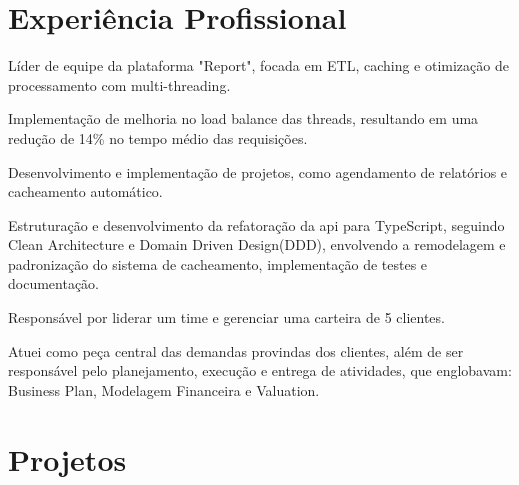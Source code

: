 \documentclass[]{deedy-resume-openfont}
\begin{document}
\begin{minipage}[t]{0.63\textwidth} 


\section{Experiência Profissional}
\vspace{\topsep} %
\begin{tightemize}
\item Líder de equipe da plataforma "Report", focada em ETL, caching e otimização de processamento com multi-threading.
\item Implementação de melhoria no load balance das threads, resultando em uma redução de 14\% no tempo médio das requisições.
\item Desenvolvimento e implementação de projetos, como agendamento de relatórios e cacheamento automático.
\item Estruturação e desenvolvimento da refatoração da api para TypeScript, seguindo Clean Architecture e Domain Driven Design(DDD), envolvendo a remodelagem e padronização do sistema de cacheamento, implementação de testes e documentação.
\end{tightemize}
\sectionsep

\begin{tightemize}
\item Responsável por liderar um time e gerenciar uma carteira de 5 clientes.
\item Atuei como peça central das demandas provindas dos clientes, além de ser responsável pelo planejamento, execução e entrega de atividades, que englobavam: Business Plan, Modelagem Financeira e Valuation.
\end{tightemize}
\sectionsep



\section{Projetos} 


\end{minipage}
\end{document}
